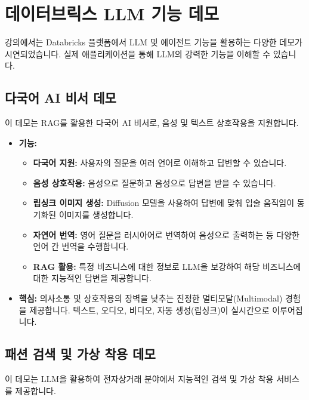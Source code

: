 \documentclass[11pt,a4paper]{article}
\begin{document}
\newpage
\section{데이터브릭스 LLM 기능 데모}

강의에서는 Databricks 플랫폼에서 LLM 및 에이전트 기능을 활용하는 다양한 데모가 시연되었습니다. 실제 애플리케이션을 통해 LLM의 강력한 기능을 이해할 수 있습니다.

\subsection{다국어 AI 비서 데모}

이 데모는 RAG를 활용한 다국어 AI 비서로, 음성 및 텍스트 상호작용을 지원합니다.

\begin{itemize}
    \item \textbf{기능:}
    \begin{itemize}
        \item \textbf{다국어 지원:} 사용자의 질문을 여러 언어로 이해하고 답변할 수 있습니다.
        \item \textbf{음성 상호작용:} 음성으로 질문하고 음성으로 답변을 받을 수 있습니다.
        \item \textbf{립싱크 이미지 생성:} Diffusion 모델을 사용하여 답변에 맞춰 입술 움직임이 동기화된 이미지를 생성합니다.
        \item \textbf{자연어 번역:} 영어 질문을 러시아어로 번역하여 음성으로 출력하는 등 다양한 언어 간 번역을 수행합니다.
        \item \textbf{RAG 활용:} 특정 비즈니스에 대한 정보로 LLM을 보강하여 해당 비즈니스에 대한 지능적인 답변을 제공합니다.
    \end{itemize}
    \item \textbf{핵심:} 의사소통 및 상호작용의 장벽을 낮추는 진정한 멀티모달(Multimodal) 경험을 제공합니다. 텍스트, 오디오, 비디오, 자동 생성(립싱크)이 실시간으로 이루어집니다.
\end{itemize}

\subsection{패션 검색 및 가상 착용 데모}

이 데모는 LLM을 활용하여 전자상거래 분야에서 지능적인 검색 및 가상 착용 서비스를 제공합니다.
\end{document}
